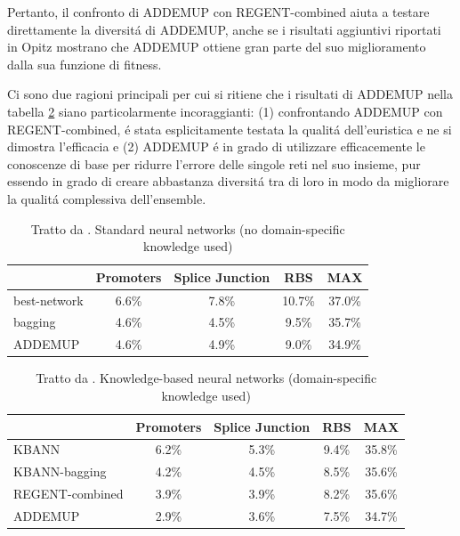 \documentclass[a4paper,12pt]{report}
\begin{document}
  Pertanto, il confronto di ADDEMUP con REGENT-combined aiuta a testare direttamente la diversit\'a di ADDEMUP, anche se i risultati aggiuntivi riportati in Opitz \cite{opitz1995anytime} mostrano che ADDEMUP ottiene gran parte del suo miglioramento dalla sua funzione di fitness. 
  
  Ci sono due ragioni principali per cui si ritiene che i risultati di ADDEMUP nella tabella \ref{KnowledgeTab} siano particolarmente incoraggianti: (1) confrontando ADDEMUP con REGENT-combined, \'e stata esplicitamente testata la qualit\'a dell'euristica e ne si dimostra l'efficacia e (2) ADDEMUP \'e in grado di utilizzare efficacemente le conoscenze di base per ridurre l'errore delle singole reti nel suo insieme, pur essendo in grado di creare abbastanza diversit\'a tra di loro in modo da migliorare la qualit\'a complessiva dell'ensemble. 
  
  \begin{table}[h]\caption{Tratto da \cite{opitz1994using}. Standard neural networks (no domain-specific knowledge used)} \label{NoKnowledgeTab}
   \centering
   \begin{tabular}[h]{|l|c|c|c|c|}
    \hline
    & Promoters & Splice Junction & RBS & MAX \\ \hline
   best-network & 6.6\% & 7.8\% & 10.7\% & 37.0\% \\ 
   bagging & 4.6\% & 4.5\% & 9.5\% & 35.7\% \\
   ADDEMUP & 4.6\% & 4.9\% & 9.0\% & 34.9\% \\ \hline
   \end{tabular}
  \end{table}
  
  \begin{table}[h]\caption{Tratto da \cite{opitz1994using}. Knowledge-based neural networks (domain-specific knowledge used)} \label{KnowledgeTab}
   \centering
   \begin{tabular}[h]{|l|c|c|c|c|}
    \hline
       & Promoters & Splice Junction & RBS & MAX \\ \hline
    KBANN & 6.2\% & 5.3\% & 9.4\% & 35.8\% \\ 
    KBANN-bagging & 4.2\% & 4.5\% & 8.5\% & 35.6\% \\
    REGENT-combined & 3.9\% & 3.9\% & 8.2\% & 35.6\% \\
    ADDEMUP & 2.9\% & 3.6\% & 7.5\% & 34.7\% \\ \hline
   \end{tabular}
  \end{table}
\end{document}
